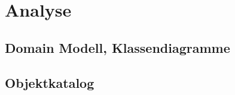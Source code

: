 \chapter{Analyse}
\label{pd-analyse}

\section{Domain Modell, Klassendiagramme}


\section{Objektkatalog}